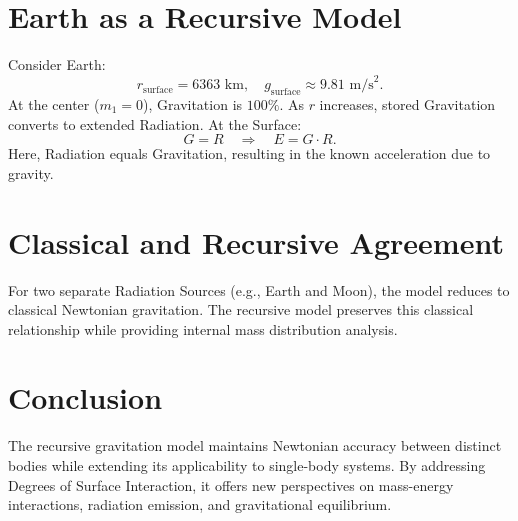 \documentclass[12pt]{article}
\begin{document}
\section{Earth as a Recursive Model}
Consider Earth:
\[
r_{\text{surface}} = 6363 \text{ km}, \quad g_{\text{surface}} \approx 9.81 \text{ m/s}^2.
\]
At the center ($m_1 = 0$), Gravitation is $100\%$. As $r$ increases, stored Gravitation converts to extended Radiation. At the Surface:
\[
G = R \quad \Rightarrow \quad E = G \cdot R.
\]
Here, Radiation equals Gravitation, resulting in the known acceleration due to gravity.

\section{Classical and Recursive Agreement}
For two separate Radiation Sources (e.g., Earth and Moon), the model reduces to classical Newtonian gravitation. The recursive model preserves this classical relationship while providing internal mass distribution analysis.

\section{Conclusion}
The recursive gravitation model maintains Newtonian accuracy between distinct bodies while extending its applicability to single-body systems. By addressing Degrees of Surface Interaction, it offers new perspectives on mass-energy interactions, radiation emission, and gravitational equilibrium.
\end{document}
